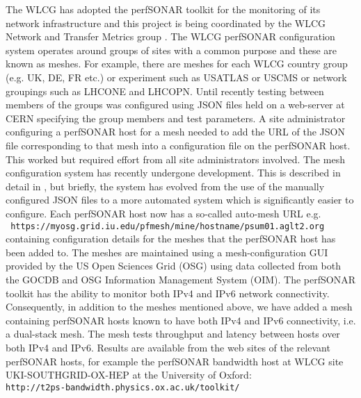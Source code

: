 
The WLCG has adopted the perfSONAR toolkit \cite{perfsonar} for
the monitoring of its network infrastructure and this project is
being coordinated by the WLCG Network and Transfer Metrics group
\cite{wlcg-NTMG}.  The WLCG perfSONAR configuration system operates around
groups of sites with a common purpose and these are known as meshes.
For example, there are meshes for each WLCG country
group (e.g. UK, DE, FR etc.) or experiment such as USATLAS or USCMS or
network groupings such as LHCONE and LHCOPN. Until recently testing
between members of the groups was configured using JSON files held on a
web-server at CERN specifying the group members and test parameters. A
site administrator configuring a perfSONAR host for a mesh needed to add
the URL of the JSON file corresponding to that mesh into a configuration
file on the perfSONAR host. This worked but required effort from all
site administrators involved. The mesh configuration system has recently
undergone development. This is described in detail in \cite{wlcg-NTMG},
but briefly, the system has evolved from the use of the manually
configured JSON files to a more automated system which is significantly
easier to configure. Each perfSONAR host now has a so-called auto-mesh
URL e.g. \\{\tt\small  
https://myosg.grid.iu.edu/pfmesh/mine/hostname/psum01.aglt2.org}\\
containing configuration details for the meshes that the perfSONAR host
has been added to. The meshes are maintained using a mesh-configuration
GUI provided by the US Open Sciences Grid (OSG) using data collected
from both the GOCDB and OSG Information Management System (OIM). The
perfSONAR toolkit has the ability to monitor both IPv4 and IPv6 network
connectivity. Consequently, in addition to the meshes mentioned above, we
have added a mesh containing perfSONAR hosts known to have both IPv4 and
IPv6 connectivity, i.e. a dual-stack mesh. The mesh tests throughput and
latency between hosts over both IPv4 and IPv6. Results are available from
the web sites of the relevant perfSONAR hosts, for example the perfSONAR
bandwidth host at WLCG site UKI-SOUTHGRID-OX-HEP at the University of
Oxford: \\{\tt\small http://t2ps-bandwidth.physics.ox.ac.uk/toolkit/}\\ 
